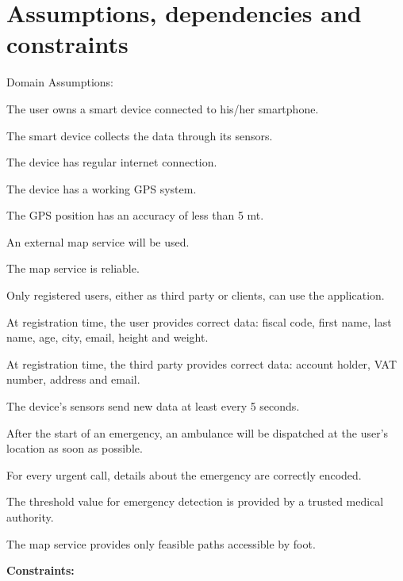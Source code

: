 \section{Assumptions, dependencies and constraints}
Domain Assumptions:
\begin{enumerate}[label={[}D.\arabic*{]}]

\item \label{d:1}
The user owns a smart device connected to his/her smartphone.
\item\label{d:2}
The smart device collects the data through its sensors.
\item\label{d:3}
The device has regular internet connection.
\item\label{d:4}
The device has a working GPS system.
\item\label{d:5}
The GPS position has an accuracy of less than 5 mt.
\item\label{d:6}
An external map service will be used.
\item\label{d:7}
The map service is reliable.
\item\label{d:8}
Only registered users, either as third party or clients, can use the application.
\item\label{d:9}
At registration time, the user provides correct data: fiscal code, first name, last name, age, city, email, height and weight.
\item\label{d:10}
At registration time, the third party provides correct data: account holder, VAT number, address and email.
\item\label{d:11}
The device’s sensors send new data at least every 5 seconds.
\item\label{d:12}
After the start of an emergency, an ambulance will be dispatched at the user’s location as soon as possible.
\item\label{d:13}
For every urgent call, details about the emergency are correctly encoded.
\item\label{d:14}
The threshold value for emergency detection is provided by a trusted medical authority.
\item\label{d:16}
The map service provides only feasible paths accessible by foot.
\end{enumerate}

\vspace{10mm}

\textbf{Constraints:}

